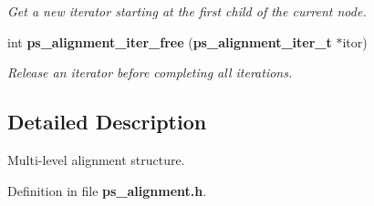 \begin{DoxyCompactItemize}
\begin{DoxyCompactList}\small\item\em Get a new iterator starting at the first child of the current node. \end{DoxyCompactList}\item 
int {\bf ps\-\_\-alignment\-\_\-iter\-\_\-free} ({\bf ps\-\_\-alignment\-\_\-iter\-\_\-t} $\ast$itor)\label{ps__alignment_8h_a80e0020539ea622706bf63883e24d301}

\begin{DoxyCompactList}\small\item\em Release an iterator before completing all iterations. \end{DoxyCompactList}\end{DoxyCompactItemize}


\subsection{Detailed Description}
Multi-\/level alignment structure. 

Definition in file {\bf ps\-\_\-alignment.\-h}.

